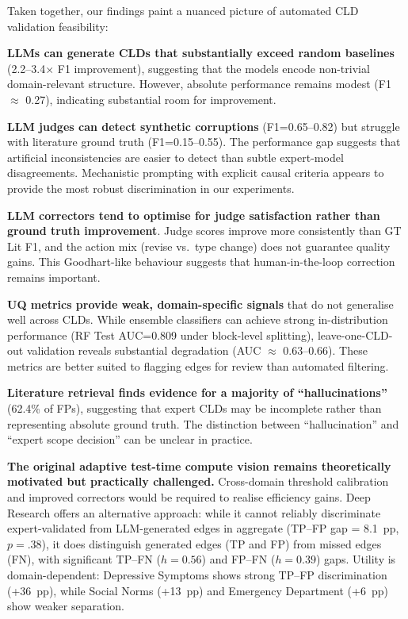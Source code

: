 Taken together, our findings paint a nuanced picture of automated CLD validation feasibility:

\textbf{LLMs can generate CLDs that substantially exceed random baselines} (2.2--3.4$\times$ F1 improvement), suggesting that the models encode non-trivial domain-relevant structure. However, absolute performance remains modest (F1 $\approx$ 0.27), indicating substantial room for improvement.

\textbf{LLM judges can detect synthetic corruptions} (F1=0.65--0.82) but struggle with literature ground truth (F1=0.15--0.55). The performance gap suggests that artificial inconsistencies are easier to detect than subtle expert-model disagreements. Mechanistic prompting with explicit causal criteria appears to provide the most robust discrimination in our experiments.

\textbf{LLM correctors tend to optimise for judge satisfaction rather than ground truth improvement}. Judge scores improve more consistently than GT Lit F1, and the action mix (revise vs.\ type change) does not guarantee quality gains. This Goodhart-like behaviour suggests that human-in-the-loop correction remains important.

\textbf{UQ metrics provide weak, domain-specific signals} that do not generalise well across CLDs. While ensemble classifiers can achieve strong in-distribution performance (RF Test AUC=0.809 under block-level splitting), leave-one-CLD-out validation reveals substantial degradation (AUC $\approx$ 0.63--0.66). These metrics are better suited to flagging edges for review than automated filtering.

\textbf{Literature retrieval finds evidence for a majority of ``hallucinations''} (62.4\% of FPs), suggesting that expert CLDs may be incomplete rather than representing absolute ground truth. The distinction between ``hallucination'' and ``expert scope decision'' can be unclear in practice.

\textbf{The original adaptive test-time compute vision remains theoretically motivated but practically challenged.} Cross-domain threshold calibration and improved correctors would be required to realise efficiency gains. Deep Research offers an alternative approach: while it cannot reliably discriminate expert-validated from LLM-generated edges in aggregate (TP--FP gap = 8.1~pp, $p = .38$), it does distinguish generated edges (TP and FP) from missed edges (FN), with significant TP--FN ($h=0.56$) and FP--FN ($h=0.39$) gaps. Utility is domain-dependent: Depressive Symptoms shows strong TP--FP discrimination (+36~pp), while Social Norms (+13~pp) and Emergency Department (+6~pp) show weaker separation.

